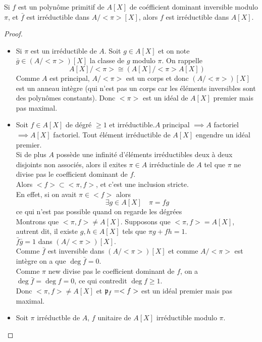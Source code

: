 \begin{rappel}
	Si $f$ est un polynôme primitif de $A[X]$ de coéfficient dominant inversible modulo $\pi$, et $\bar{f}$ est irréductible dans $A/<\pi>[X]$, alors $f$ est irréductible dans $A[X]$.
\end{rappel}

\begin{proof}
	\begin{itemize}
		\item Si $\pi$ est un irréductible de $A$. Soit $g \in A[X]$ et on note $\bar{g} \in (A/<\pi>)[X]$ la classe de $g$ modulo $\pi$.
		      On rappelle
		      $$ A[X]/<\pi> \cong (A[X]/<\pi>A[X])$$
		      Comme $A$ est principal, $A/<\pi>$ est un corps et donc $(A/<\pi>)[X]$ est un anneau intègre (qui n'est pas un corps car les éléments
		      inversibles sont des polynômes constants). Donc $<\pi>$ est un idéal de $A[X]$ premier mais pas maximal.
		\item Soit $f \in A[X]$ de dégré $\geq 1$ et irréductible.$A$ principal $\implies A$ factoriel $\implies A[X]$ factoriel.
		      Tout élément irréductible de $A[X]$ engendre un idéal premier. \\
		      Si de plus $A$ possède une infinité d'éléments irréductibles deux à deux disjoints non associés, alors il exites $\pi \in A$ irréductinle de $A$
		      tel que $\pi$ ne divise pas le coefficient dominant de $f$.\\
		      Alors $<f>  \subset <\pi,f>$, et c'est une inclusion stricte.\\
		      En effet, si on avait $\pi \in <f>$ alors
		      $$\exists g \in A[X]\quad \pi = fg$$ ce qui n'est pas possible quand on regarde les dégrées \\
		      Montrons que $<\pi, f> \neq A[X]$.
		      Supposons que $<\pi, f> = A[X]$, autrent dit, il existe $g,h \in A[X]$ tels que $\pi g + fh = 1$.\\
		      $ \bar{f}\bar{g} = 1$ dans $(A/<\pi>)[X]$.\\
		      Comme $\bar{f}$ est inversible dans $(A/<\pi>)[X]$ et comme $A/<\pi>$ est intègre on a que $\deg \bar{f} = 0$.\\
		      Comme $\pi$ new divise pas le coefficient dominant de $f$, on a $\deg \bar{f} = \deg f = 0$, ce qui contredit $\deg f \geq 1$.\\
		      Donc $<\pi, f> \neq A[X]$ et $\mathfrak{p}_f = <f>$ est un idéal premier mais pas maximal.
		\item  Soit $\pi$ irréductble de $A$, $f$ unitaire de $A[X]$ irréductible modulo $\pi$.\\

\end{itemize}
\end{proof}
